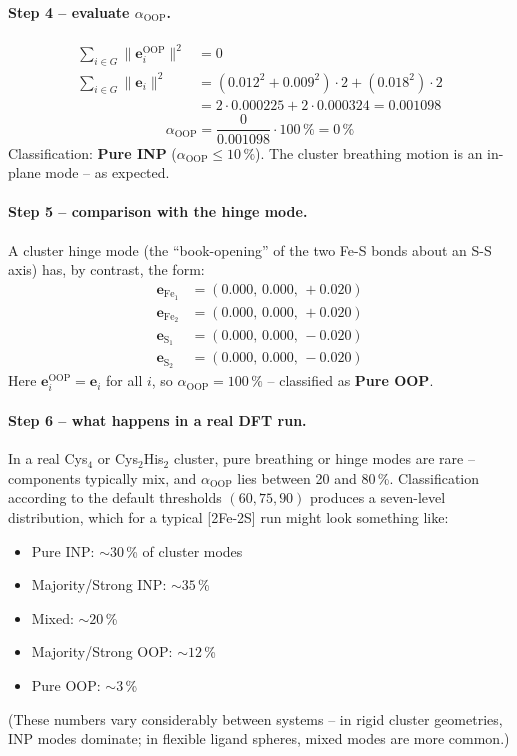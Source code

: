 \documentclass[11pt,a4paper,twoside]{article}
\newcommand{\OOP}{\mathrm{OOP}}
\theoremstyle{remark}
\begin{document}
\paragraph{Step 4 -- evaluate $\alpha_{\OOP}$.}
\begin{align*}
  \sum_{i \in G} \|\mathbf{e}_i^\text{OOP}\|^2 &= 0 \\
  \sum_{i \in G} \|\mathbf{e}_i\|^2 &= (0.012^2 + 0.009^2)\cdot 2 + (0.018^2)\cdot 2 \\
   &= 2\cdot 0.000225 + 2\cdot 0.000324 = 0.001098
\end{align*}
\begin{equation*}
  \alpha_{\OOP} = \frac{0}{0.001098}\cdot 100\,\% = 0\,\%
\end{equation*}
Classification: \textbf{Pure INP} ($\alpha_{\OOP} \leq 10\,\%$). The
cluster breathing motion is an in-plane mode -- as expected.

\paragraph{Step 5 -- comparison with the hinge mode.}
A cluster hinge mode (the ``book-opening'' of the two Fe-S bonds
about an S-S axis) has, by contrast, the form:
\begin{align*}
  \mathbf{e}_{\text{Fe}_1} &= (0.000,\, 0.000,\, +0.020) \\
  \mathbf{e}_{\text{Fe}_2} &= (0.000,\, 0.000,\, +0.020) \\
  \mathbf{e}_{\text{S}_1}  &= (0.000,\, 0.000,\, -0.020) \\
  \mathbf{e}_{\text{S}_2}  &= (0.000,\, 0.000,\, -0.020)
\end{align*}
Here $\mathbf{e}_i^\text{OOP} = \mathbf{e}_i$ for all $i$,
so $\alpha_{\OOP} = 100\,\%$ -- classified as \textbf{Pure OOP}.

\paragraph{Step 6 -- what happens in a real DFT run.}
In a real Cys$_4$ or Cys$_2$His$_2$ cluster, pure breathing or
hinge modes are rare -- components typically mix, and
$\alpha_{\OOP}$ lies between 20 and 80\,\%. Classification
according to the default thresholds $(60, 75, 90)$ produces a
seven-level distribution, which for a typical [2Fe-2S] run
might look something like:
\begin{itemize}\setlength{\itemsep}{0pt}
  \item Pure INP: $\sim 30$\,\% of cluster modes
  \item Majority/Strong INP: $\sim 35$\,\%
  \item Mixed: $\sim 20$\,\%
  \item Majority/Strong OOP: $\sim 12$\,\%
  \item Pure OOP: $\sim 3$\,\%
\end{itemize}
(These numbers vary considerably between systems -- in rigid
cluster geometries, INP modes dominate; in flexible ligand spheres,
mixed modes are more common.)
\end{document}
